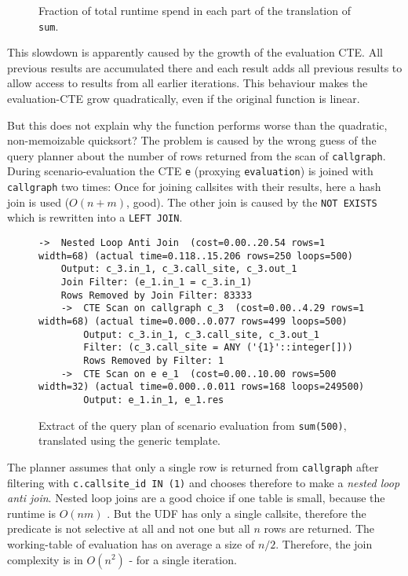 \begin{figure}[h!]
    \centering\small
    
    \caption{Fraction of total runtime spend in each part of the translation of \texttt{sum}.}
    \label{fig:split_sr_times}
\end{figure}

This slowdown is apparently caused by the growth of the evaluation CTE. All previous results are accumulated there and each result adds all previous results to allow access to results from all earlier iterations. This behaviour makes the evaluation-CTE grow quadratically, even if the original function is linear.

But this does not explain why the function performs worse than the quadratic, non-memoizable quicksort? The problem is caused by the wrong guess of the query planner about the number of rows returned from the scan of \texttt{callgraph}. During scenario-evaluation the CTE \texttt{e} (proxying \texttt{evaluation}) is joined with \texttt{callgraph} two times: Once for joining callsites with their results, here a hash join is used ($O(n+m)$, good). The other join is caused by the \texttt{NOT EXISTS} which is rewritten into a \texttt{LEFT JOIN}.

\begin{figure}[h!]
    \centering\scriptsize
    \begin{verbatim}
->  Nested Loop Anti Join  (cost=0.00..20.54 rows=1 width=68) (actual time=0.118..15.206 rows=250 loops=500)
	Output: c_3.in_1, c_3.call_site, c_3.out_1
	Join Filter: (e_1.in_1 = c_3.in_1)
	Rows Removed by Join Filter: 83333
	->  CTE Scan on callgraph c_3  (cost=0.00..4.29 rows=1 width=68) (actual time=0.000..0.077 rows=499 loops=500)
	    Output: c_3.in_1, c_3.call_site, c_3.out_1
	    Filter: (c_3.call_site = ANY ('{1}'::integer[]))
	    Rows Removed by Filter: 1
	->  CTE Scan on e e_1  (cost=0.00..10.00 rows=500 width=32) (actual time=0.000..0.011 rows=168 loops=249500)
	    Output: e_1.in_1, e_1.res
    \end{verbatim}
    \caption{Extract of the query plan of scenario evaluation from \texttt{sum(500)}, translated using the generic template.}
    \label{plan:sum}
\end{figure}

The planner assumes that only a single row is returned from \texttt{callgraph} after filtering with \texttt{c.callsite\_id IN (1)} and chooses therefore to make a \textit{nested loop anti join}. Nested loop joins are a good choice if one table is small, because the runtime is $O(nm)$ \cite{}. But the UDF has only a single callsite, therefore the predicate is not selective at all and not one but all $n$ rows are returned. The working-table of evaluation has on average a size of $n/2$. Therefore, the join complexity is in $O(n^2)$ - for a single iteration. 

